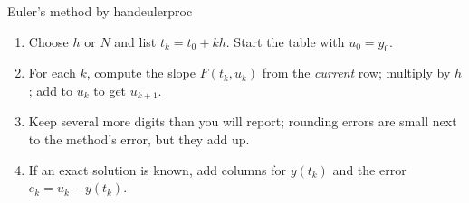 \documentclass[11pt]{article}
\begin{document}
\begin{proc}{Euler's method by hand}{eulerproc}
\begin{enumerate}[nosep]
  \item Choose $h$ or $N$ and list $t_k=t_0+kh$. Start the table with $u_0=y_0$.
  \item For each $k$, compute the slope $F(t_k,u_k)$ from the \emph{current} row; multiply by $h$; add to $u_k$ to get $u_{k+1}$.
  \item Keep several more digits than you will report; rounding errors are small next to the method's error, but they add up.
  \item If an exact solution is known, add columns for $y(t_k)$ and the error $e_k=u_k-y(t_k)$.
\end{enumerate}
\end{proc}
\end{document}
